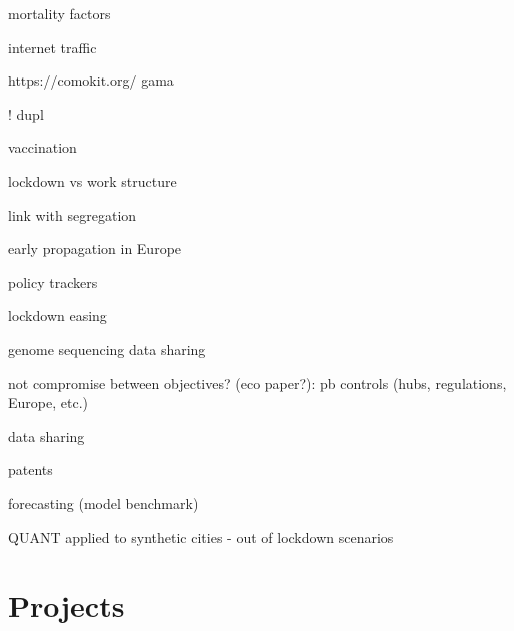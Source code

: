 \documentclass[10pt]{article}
\begin{document}
\cite{williamson2020opensafely} mortality factors

\cite{feldmann2020lockdown} internet traffic

https://comokit.org/ gama \cite{gaudou2020comokit}

\cite{murphy2020inside}

\cite{pullano2020underdetection}

\cite{mallapaty2020what}

\cite{Schlosser32883}

\cite{trump2020combine}

\cite{pullano2020underdetection} ! dupl

\cite{mallapaty2021covid} vaccination

\cite{heroy2020controlling} lockdown vs work structure

\cite{mallapaty2021major}

\cite{meng2021covid}

\cite{Torrats-Espinosae2015577118} link with segregation

\cite{nadeau2021origin} early propagation in Europe

\cite{schiermeier2021which} policy trackers

\cite{aschwanden2021five}

\cite{Shumskye2019225118}

\cite{cheetham2021determining}

\cite{irwin2021what}

\cite{mallapaty2021after}

\cite{10.1093/jtm/taab045}

\cite{mallapaty2021india}

\cite{andronico2021scenarios} lockdown easing

\cite{vogel2021do}

\cite{maxmen2021one} genome sequencing data sharing

\cite{oliu2021sars} not compromise between objectives? (eco paper?): pb controls (hubs, regulations, Europe, etc.)

\cite{maxmen2021why} data sharing

\cite{maxmen2021shock} patents

\cite{friedman2021forecasts} forecasting (model benchmark)

\cite{batty2021socially} QUANT applied to synthetic cities - out of lockdown scenarios



\section{Projects}
\end{document}
